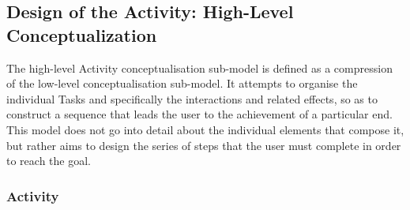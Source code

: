 \subsection*{Design of the Activity: High-Level Conceptualization}

The high-level Activity conceptualisation sub-model is defined as a compression of the low-level conceptualisation sub-model. It attempts to organise the individual Tasks and specifically the interactions and related effects, so as to construct a sequence that leads the user to the achievement of a particular end. This model does not go into detail about the individual elements that compose it, but rather aims to design the series of steps that the user must complete in order to reach the goal. 

\subsubsection*{Activity}

